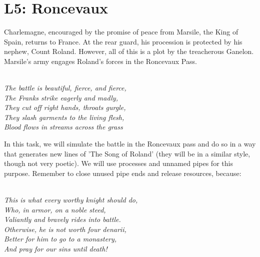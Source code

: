 \documentclass[addpoints,a4paper]{exam}
\begin{document}
\cellwidth{2cm}
\noindent \gradetable[h]
\renewcommand{\thefootnote}{\fnsymbol{footnote}}

\section*{L5: Roncevaux}

Charlemagne, encouraged by the promise of peace from Marsile, the King of Spain, returns to France. At the rear guard, his procession is protected by his nephew, Count Roland. However, all of this is a plot by the treacherous Ganelon. Marsile’s army engages Roland’s forces in the Roncevaux Pass.


\noindent \hspace{8cm} \parbox{10cm}{\textit{\\
The battle is beautiful, fierce, and fierce,\\
The Franks strike eagerly and madly,\\
They cut off right hands, throats gurgle,\\
They slash garments to the living flesh,\\
Blood flows in streams across the grass\\
}}


In this task, we will simulate the battle in the Roncevaux pass and do so in a way that generates new lines of 'The Song of Roland' (they will be in a similar style, though not very poetic). We will use processes and unnamed pipes for this purpose. Remember to close unused pipe ends and release resources, because:


\noindent \hspace{8cm} \parbox{10cm}{\textit{\\
This is what every worthy knight should do,\\
Who, in armor, on a noble steed,\\
Valiantly and bravely rides into battle.\\
Otherwise, he is not worth four denarii,\\
Better for him to go to a monastery,\\
And pray for our sins until death!\\
}}
\end{document}
